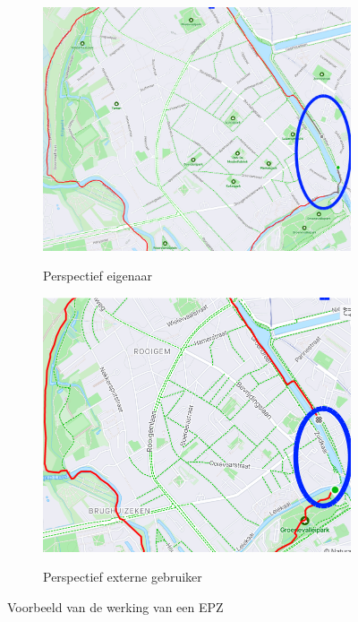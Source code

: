 \begin{figure}[h]
    \centering
    \begin{subfigure}[b]{.49\textwidth}
        \centering
        \caption{Perspectief eigenaar}
        \includegraphics[width=1\textwidth]{fig/EPZ-mechanisme/Example_EPZ_InternalView.png}\label{fig:EPZ_internal}
    \end{subfigure}\hfill
    \begin{subfigure}[b]{.49\textwidth}
        \centering
        \caption{Perspectief externe gebruiker}
        \includegraphics[width=1\textwidth]{fig/EPZ-mechanisme/Example_EPZ_ExternalView.png}\label{fig:EPZ_external}
    \end{subfigure}
    \caption{Voorbeeld van de werking van een EPZ}\label{fig:EPZ_Voorbeeld}
\end{figure}

